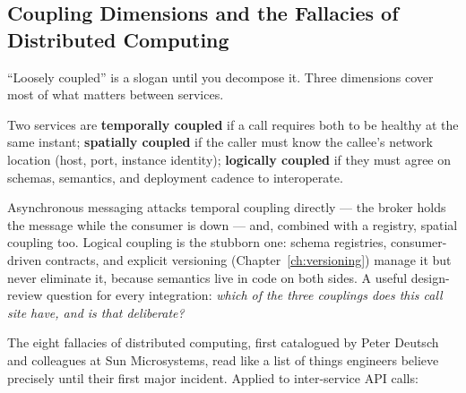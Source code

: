 \subsection{Coupling Dimensions and the Fallacies of Distributed Computing}
\label{subsec:ch15-coupling}

``Loosely coupled'' is a slogan until you decompose it. Three dimensions
cover most of what matters between services.

\begin{definition}
\label{def:ch15-coupling}
Two services are \textbf{temporally coupled} if a call requires both to be
healthy at the same instant; \textbf{spatially coupled} if the caller must
know the callee's network location (host, port, instance identity);
\textbf{logically coupled} if they must agree on schemas, semantics, and
deployment cadence to interoperate.
\end{definition}

Asynchronous messaging attacks temporal coupling directly --- the broker
holds the message while the consumer is down --- and, combined with a
registry, spatial coupling too. Logical coupling is the stubborn one:
schema registries, consumer-driven contracts, and explicit versioning
(Chapter~\ref{ch:versioning}) manage it but never eliminate it, because
semantics live in code on both sides. A useful design-review question for
every integration: \emph{which of the three couplings does this call site
have, and is that deliberate?}

The eight fallacies of distributed computing, first catalogued by Peter
Deutsch and colleagues at Sun Microsystems, read like a list of things
engineers believe precisely until their first major incident. Applied to
inter-service API calls:

